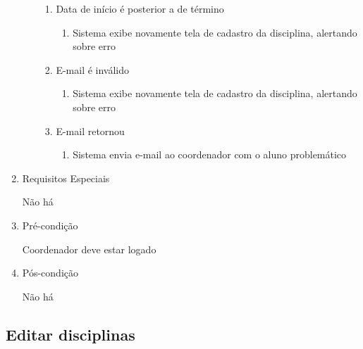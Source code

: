 \begin{enumerate}
\begin{enumerate}
\begin{enumerate}
    \item Data de início é posterior a de término

\begin{enumerate}
    \item Sistema exibe novamente tela de cadastro da disciplina, alertando sobre erro


\end{enumerate}
    \item E-mail é inválido

\begin{enumerate}
    \item Sistema exibe novamente tela de cadastro da disciplina, alertando sobre erro


\end{enumerate}
    \item E-mail retornou

\begin{enumerate}
    \item Sistema envia e-mail ao coordenador com o aluno problemático




\end{enumerate}
\end{enumerate}
\end{enumerate}
    \item Requisitos Especiais


Não há


    \item Pré-condição


Coordenador deve estar logado


    \item Pós-condição

    Não há
\end{enumerate}

\subsection{Editar disciplinas}


